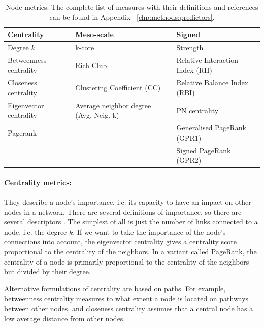 \begin{table}[t]
\caption[Node metrics]{Node metrics. The complete list of measures with their definitions and references can be found in Appendix~ \ref{chp:methods:predictors}.}\label{chp:2:tab:nodeMetrics}
\begin{tabularx}{\textwidth}{XXX}
\hline
Centrality             & Meso-scale                              & Signed                            \\
\hline
\hline
Degree $k$             & k-core                                  & Strength                          \\
Betweenness centrality & Rich Club                               & Relative Interaction  Index (RII) \\
Closeness centrality   & Clustering Coefficient  (CC)            & Relative Balance  Index (RBI)     \\
Eigenvector centrality & Average neighbor degree  (Avg. Neig. k) & PN centrality                     \\
Pagerank               &                                         & Generalised PageRank  (GPR1)            \\
                       &                                         & Signed PageRank   (GPR2)  \\             
                       \hline
\end{tabularx}
\end{table}


\paragraph{Centrality metrics:} They describe a node's importance, i.e. its capacity to have an impact on other nodes in a network. There are several definitions of importance, so there are several descriptors \cite{Newman2010}. The simplest of all is just the number of links connected to a node, i.e. the degree $k$. If we want to take the importance of the node's connections into account, the eigenvector centrality gives a centrality score proportional to the centrality of the neighbors. In a variant called PageRank, the centrality of a node is primarily proportional to the centrality of the neighbors but divided by their degree.

 Alternative formulations of centrality are based on paths. For example, betweenness centrality measures to what extent a node is located on pathways between other nodes, and closeness centrality assumes that a central node has a low average distance from other nodes.


